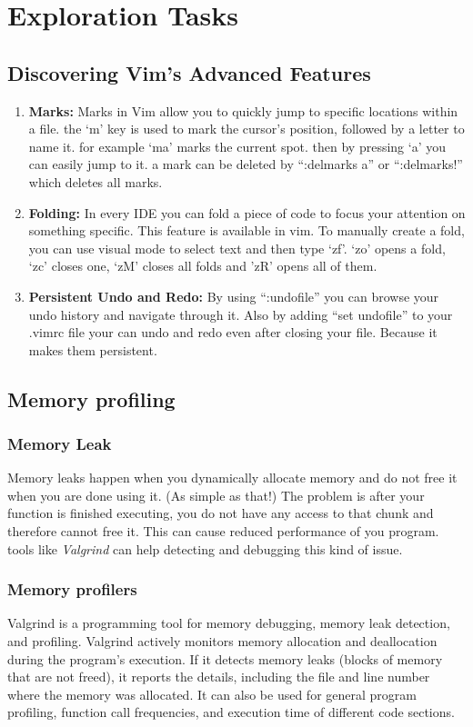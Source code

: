 \documentclass[12pt]{article}
\begin{document}
\newpage

\section{Exploration Tasks}
\subsection{Discovering Vim's Advanced Features}
\begin{enumerate}
    \item \textbf{Marks:} Marks in Vim allow you to quickly jump to specific locations within a file. the `m' key is used to mark the cursor's position, followed by a letter to name it. for example `ma' marks the current spot. then by pressing `a' you can easily jump to it. a mark can be deleted by ``:delmarks a'' or ``:delmarks!'' which deletes all marks.
    \item \textbf{Folding:} In every IDE you can fold a piece of code to focus your attention on something specific. This feature is available in vim. To manually create a fold, you can use visual mode to select text and then type `zf'. `zo' opens a fold, `zc' closes one, `zM' closes all folds and 'zR' opens all of them.
    \item \textbf{Persistent Undo and Redo:} By using ``:undofile'' you can browse your undo history and navigate through it. Also by adding ``set undofile'' to your .vimrc file your can undo and redo even after closing your file. Because it makes them persistent. 
\end{enumerate}

\subsection{Memory profiling}
\subsubsection{Memory Leak}
Memory leaks happen when you dynamically allocate memory and do not free it when you are done using it. (As simple as that!) The problem is after your function is finished executing, you do not have any access to that chunk and therefore cannot free it. This can cause reduced performance of you program. tools like \emph{Valgrind} can help detecting and debugging this kind of issue. 

\subsubsection{Memory profilers}
Valgrind is a programming tool for memory debugging, memory leak detection, and profiling. Valgrind actively monitors memory allocation and deallocation during the program's execution. If it detects memory leaks (blocks of memory that are not freed), it reports the details, including the file and line number where the memory was allocated. It can also be used for general program profiling, function call frequencies, and execution time of different code sections.
\end{document}
